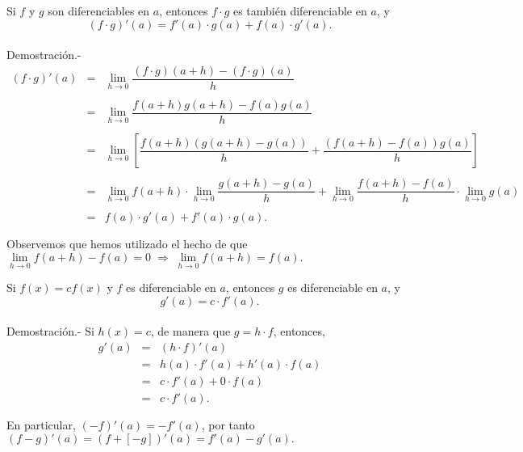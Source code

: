 \begin{teo}
    Si $f$ y $g$ son diferenciables en $a$, entonces $f\cdot g$ es también diferenciable en $a$, y
    $$(f\cdot g)'(a)=f'(a)\cdot g(a)+f(a)\cdot g'(a).$$\\
	Demostración.-\; 
	$$\begin{array}{rcl}
	    (f\cdot g)'(a) &=& \lim\limits_{h\to 0} \dfrac{(f\cdot g)(a+h)-(f\cdot g)(a)}{h}\\\\
			   &=& \lim\limits_{h\to 0} \dfrac{f(a+h)g(a+h)-f(a)g(a)}{h}\\\\
			   &=& \lim\limits_{h\to 0} \left[\dfrac{f(a+h)\left(g(a+h)-g(a)\right)}{h}+\dfrac{\left(f(a+h)-f(a)\right)g(a)}{h}\right]\\\\
			   &=& \lim\limits_{h\to 0} f(a+h)\cdot \lim\limits_{h\to 0} \dfrac{g(a+h)-g(a)}{h}+\lim\limits_{h\to 0} \dfrac{f(a+h)-f(a)}{h} \cdot \lim\limits_{h\to 0} g(a)\\\\
			   &=&f(a)\cdot g'(a)+f'(a)\cdot g(a).\\\\
	\end{array}$$
	Observemos que hemos utilizado el hecho de que $\lim\limits_{h\to 0}f(a+h)-f(a)=0\; \Rightarrow \; \lim\limits_{h\to 0}f(a+h)=f(a).$
\end{teo}

\begin{teo}
    Si $f(x)=cf(x)$ y $f$ es diferenciable en $a$, entonces $g$ es diferenciable en $a$, y
    $$g'(a)=c\cdot f'(a).$$\\
	Demostración.-\; Si $h(x)=c$, de manera que $g=h\cdot f$, entonces,
	$$\begin{array}{rcl}
	    g'(a)&=&(h\cdot f)'(a)\\
		 &=&h(a)\cdot f'(a)+h'(a)\cdot f(a)\\
		 &=&c\cdot f'(a)+0\cdot f(a)\\
		 &=&c\cdot f'(a).\\\\
	\end{array}$$
	En particular, $(-f)'(a)=-f'(a)$, por tanto $(f-g)'(a)=\left(f+[-g]\right)'(a)=f'(a)-g'(a).$
\end{teo}

